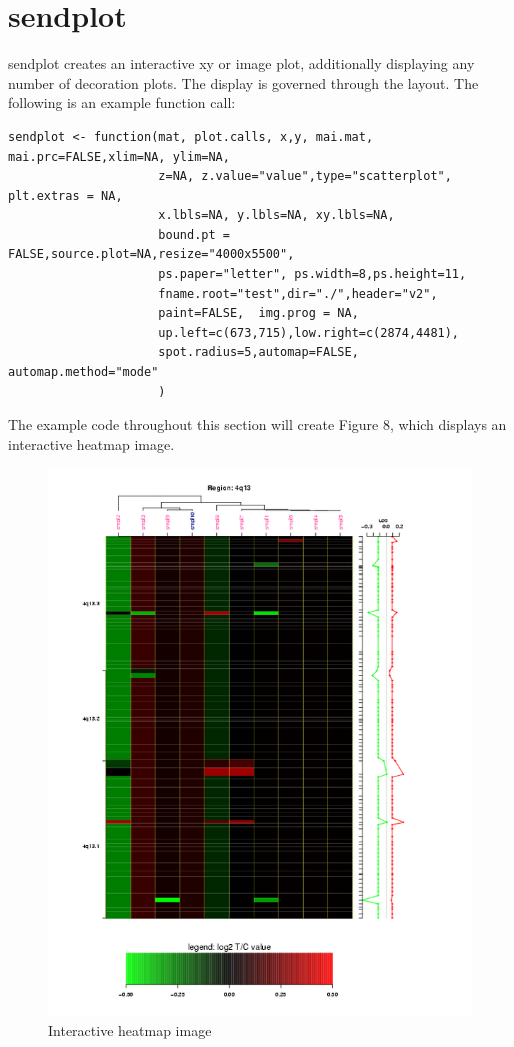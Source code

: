 \documentclass[]{article}
\begin{document}
\newpage


\section{sendplot}

\indent sendplot creates an interactive xy or image plot, additionally displaying any number of decoration plots. The display is governed through the layout. The following is an example function call:
\begin{verbatim}
sendplot <- function(mat, plot.calls, x,y, mai.mat, mai.prc=FALSE,xlim=NA, ylim=NA,
                     z=NA, z.value="value",type="scatterplot", plt.extras = NA,
                     x.lbls=NA, y.lbls=NA, xy.lbls=NA,
                     bound.pt = FALSE,source.plot=NA,resize="4000x5500", 
                     ps.paper="letter", ps.width=8,ps.height=11,
                     fname.root="test",dir="./",header="v2",
                     paint=FALSE,  img.prog = NA,
                     up.left=c(673,715),low.right=c(2874,4481),
                     spot.radius=5,automap=FALSE, automap.method="mode"
                     )
\end{verbatim}

\indent The example code throughout this section will create Figure 8, which displays an interactive heatmap image. 
\begin{center}
\begin{figure}
\includegraphics{test}
\caption{Interactive heatmap image}
\end{figure}
\end{center}
\end{document}

